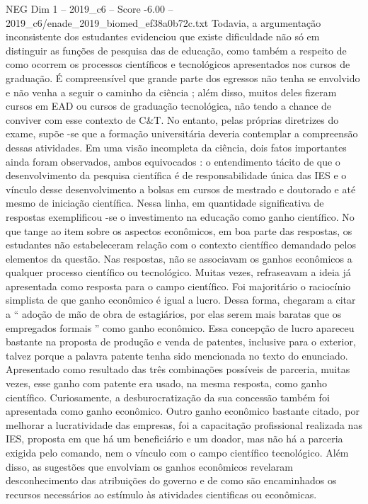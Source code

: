 \begin{textsample}{NEG Dim 1 – 2019\_c6 – Score -6.00 – 2019\_c6/enade\_2019\_biomed\_ef38a0b72c.txt}
Todavia, a argumentação inconsistente dos estudantes evidenciou que existe dificuldade não só em distinguir as funções de pesquisa das de educação, como também a respeito de como ocorrem os processos científicos e tecnológicos apresentados nos cursos de graduação.
É compreensível que grande parte dos egressos não tenha se envolvido e não venha a seguir o caminho da ciência ; além disso, muitos deles fizeram cursos em EAD ou cursos de graduação tecnológica, não tendo a chance de conviver com esse contexto de C\&T.
No entanto, pelas próprias diretrizes do exame, supõe -se que a formação universitária deveria contemplar a compreensão dessas atividades.
Em uma visão incompleta da ciência, dois fatos importantes ainda foram observados, ambos equivocados : o entendimento tácito de que o desenvolvimento da pesquisa científica é de responsabilidade única das IES e o vínculo desse desenvolvimento a bolsas em cursos de mestrado e doutorado e até mesmo de iniciação científica.
Nessa linha, em quantidade significativa de respostas exemplificou -se o investimento na educação como ganho científico.
No que tange ao item sobre os aspectos econômicos, em boa parte das respostas, os estudantes não estabeleceram relação com o contexto científico demandado pelos elementos da questão.
Nas respostas, não se associavam os ganhos econômicos a qualquer processo científico ou tecnológico.
Muitas vezes, refraseavam a ideia já apresentada como resposta para o campo científico.
Foi majoritário o raciocínio simplista de que ganho econômico é igual a lucro.
Dessa forma, chegaram a citar a “ adoção de mão de obra de estagiários, por elas serem mais baratas que os empregados formais ” como ganho econômico.
Essa concepção de lucro apareceu bastante na proposta de produção e venda de patentes, inclusive para o exterior, talvez porque a palavra patente tenha sido mencionada no texto do enunciado.
Apresentado como resultado das três combinações possíveis de parceria, muitas vezes, esse ganho com patente era usado, na mesma resposta, como ganho científico.
Curiosamente, a desburocratização da sua concessão também foi apresentada como ganho econômico.
Outro ganho econômico bastante citado, por melhorar a lucratividade das empresas, foi a capacitação profissional realizada nas IES, proposta em que há um beneficiário e um doador, mas não há a parceria exigida pelo comando, nem o vínculo com o campo científico tecnológico.
Além disso, as sugestões que envolviam os ganhos econômicos revelaram desconhecimento das atribuições do governo e de como são encaminhados os recursos necessários ao estímulo às atividades cientificas ou econômicas.

\end{textsample}
